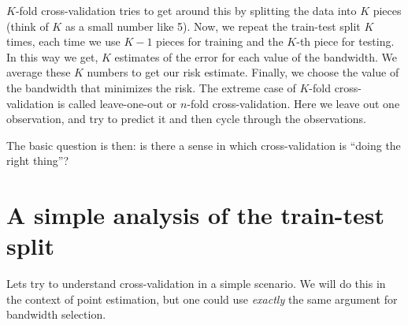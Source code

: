 \documentclass[twoside,12pt]{article}
\begin{document}
$K$-fold cross-validation tries to get around this by splitting the data into $K$ pieces (think of $K$ as a small number like 5). Now, we repeat the train-test split $K$ times, each time we use $K-1$ pieces for training and the $K$-th piece for testing. In this way we get, $K$ estimates of the error 
for each value of the bandwidth. We average these $K$ numbers to get our risk estimate.
Finally, we choose the value of the bandwidth that minimizes the risk. The extreme case
of $K$-fold cross-validation is called leave-one-out or $n$-fold cross-validation. Here we leave 
out one observation, and try to predict it and then cycle through the observations.

The basic question is then: is there a sense in which cross-validation is ``doing the right thing''?


\section{A simple analysis of the train-test split}
Lets try to understand cross-validation in a simple scenario. 
We will do this in the context of point estimation, but one could use \emph{exactly} the same argument for bandwidth selection.
\end{document}
